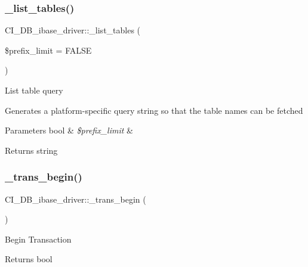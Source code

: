 \subsubsection{\texorpdfstring{\+\_\+list\+\_\+tables()}{\_list\_tables()}}
{\footnotesize\ttfamily C\+I\+\_\+\+D\+B\+\_\+ibase\+\_\+driver\+::\+\_\+list\+\_\+tables (\begin{DoxyParamCaption}\item[{}]{\$prefix\+\_\+limit = {\ttfamily FALSE} }\end{DoxyParamCaption})\hspace{0.3cm}{\ttfamily [protected]}}

List table query

Generates a platform-\/specific query string so that the table names can be fetched


\begin{DoxyParams}[1]{Parameters}
bool & {\em \$prefix\+\_\+limit} & \\
\hline
\end{DoxyParams}
\begin{DoxyReturn}{Returns}
string 
\end{DoxyReturn}
\mbox{\label{class_c_i___d_b__ibase__driver_a1a6178127f5a21f85e71098264090b5a}} 
\subsubsection{\texorpdfstring{\+\_\+trans\+\_\+begin()}{\_trans\_begin()}}
{\footnotesize\ttfamily C\+I\+\_\+\+D\+B\+\_\+ibase\+\_\+driver\+::\+\_\+trans\+\_\+begin (\begin{DoxyParamCaption}{ }\end{DoxyParamCaption})\hspace{0.3cm}{\ttfamily [protected]}}

Begin Transaction

\begin{DoxyReturn}{Returns}
bool 
\end{DoxyReturn}
\mbox{\label{class_c_i___d_b__ibase__driver_aebfe937e89e367a26ba645c3cc32a65f}} 
